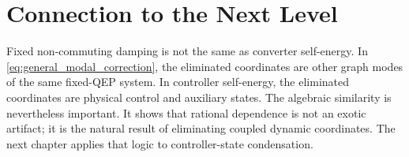 \section{Connection to the Next Level}

Fixed non-commuting damping is not the same as converter self-energy. In
\eqref{eq:general_modal_correction}, the eliminated coordinates are other
graph modes of the same fixed-QEP system. In controller self-energy, the
eliminated coordinates are physical control and auxiliary states. The algebraic
similarity is nevertheless important. It shows that rational dependence is not
an exotic artifact; it is the natural result of eliminating coupled dynamic
coordinates. The next chapter applies that logic to controller-state
condensation.
